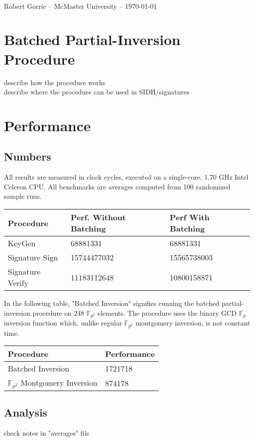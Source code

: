 \documentclass[10pt]{article}
\begin{document}
\begin{center}
\large {}\\
\normalsize {Robert Gorrie -- McMaster University -- \today}\\
\end{center}
\hline
{}


\section{Batched Partial-Inversion Procedure}

describe how the procedure works\\
describe where the procedure can be used in SIDH/signatures\\

\section{Performance}

\subsection{Numbers}

All results are measured in clock cycles, executed on a single-core, 1.70 GHz Intel Celeron CPU. All benchmarks are averages computed from 100 randomized sample runs.

\begin{center}
\begin{tabular}{@{}lll@{}}
	\toprule
	Procedure & Perf. Without Batching & Perf With Batching \\
	\midrule
	KeyGen & 68881331 & 68881331\\
	Signature Sign & 15744477032 & 15565738003\\
	Signature Verify & 11183112648 & 10800158871\\
	\bottomrule
\end{tabular}
\end{center}

In the following table, "Batched Inversion" signifies running the batched partial-inversion procedure on 248 $\mathbb{F}_{p^{2}}$ elements. The procedure uses the binary GCD $\mathbb{F}_{p}$ inversion function which, unlike regular $\mathbb{F}_{p^{2}}$ montgomery inversion, is not constant time.\\

\begin{center}
\begin{tabular}{@{}ll@{}}
	\toprule
	Procedure & Performance \\
	\midrule
	Batched Inversion & 1721718\\
	$\mathbb{F}_{p^{2}}$ Montgomery Inversion & 874178\\
	\bottomrule
\end{tabular}
\end{center}

\subsection{Analysis}

check notes in "averages" file\\
\end{document}
